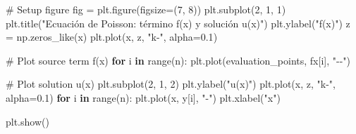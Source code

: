 \documentclass[
  spanish,
  us-letterpaper,
  DIV=11,
  numbers=noendperiod]{scrreprt}
\newenvironment{Shaded}{\begin{snugshade}}{\end{snugshade}}
\newcommand{\BuiltInTok}[1]{\textcolor[rgb]{0.00,0.23,0.31}{#1}}
\newcommand{\CommentTok}[1]{\textcolor[rgb]{0.37,0.37,0.37}{#1}}
\newcommand{\ControlFlowTok}[1]{\textcolor[rgb]{0.00,0.23,0.31}{\textbf{#1}}}
\newcommand{\DecValTok}[1]{\textcolor[rgb]{0.68,0.00,0.00}{#1}}
\newcommand{\FloatTok}[1]{\textcolor[rgb]{0.68,0.00,0.00}{#1}}
\newcommand{\KeywordTok}[1]{\textcolor[rgb]{0.00,0.23,0.31}{\textbf{#1}}}
\newcommand{\NormalTok}[1]{\textcolor[rgb]{0.00,0.23,0.31}{#1}}
\newcommand{\OperatorTok}[1]{\textcolor[rgb]{0.37,0.37,0.37}{#1}}
\newcommand{\StringTok}[1]{\textcolor[rgb]{0.13,0.47,0.30}{#1}}
\theoremstyle{plain}
\theoremstyle{definition}
\theoremstyle{remark}
\begin{document}
\begin{Shaded}
\begin{Highlighting}[]
\CommentTok{\# Setup figure}
\NormalTok{fig }\OperatorTok{=}\NormalTok{ plt.figure(figsize}\OperatorTok{=}\NormalTok{(}\DecValTok{7}\NormalTok{, }\DecValTok{8}\NormalTok{))}
\NormalTok{plt.subplot(}\DecValTok{2}\NormalTok{, }\DecValTok{1}\NormalTok{, }\DecValTok{1}\NormalTok{)}
\NormalTok{plt.title(}\StringTok{"Ecuación de Poisson: término f(x) y solución u(x)"}\NormalTok{)}
\NormalTok{plt.ylabel(}\StringTok{"f(x)"}\NormalTok{)}
\NormalTok{z }\OperatorTok{=}\NormalTok{ np.zeros\_like(x)}
\NormalTok{plt.plot(x, z, }\StringTok{"k{-}"}\NormalTok{, alpha}\OperatorTok{=}\FloatTok{0.1}\NormalTok{)}

\CommentTok{\# Plot source term f(x)}
\ControlFlowTok{for}\NormalTok{ i }\KeywordTok{in} \BuiltInTok{range}\NormalTok{(n):}
\NormalTok{    plt.plot(evaluation\_points, fx[i], }\StringTok{"{-}{-}"}\NormalTok{)}

\CommentTok{\# Plot solution u(x)}
\NormalTok{plt.subplot(}\DecValTok{2}\NormalTok{, }\DecValTok{1}\NormalTok{, }\DecValTok{2}\NormalTok{)}
\NormalTok{plt.ylabel(}\StringTok{"u(x)"}\NormalTok{)}
\NormalTok{plt.plot(x, z, }\StringTok{"k{-}"}\NormalTok{, alpha}\OperatorTok{=}\FloatTok{0.1}\NormalTok{)}
\ControlFlowTok{for}\NormalTok{ i }\KeywordTok{in} \BuiltInTok{range}\NormalTok{(n):}
\NormalTok{    plt.plot(x, y[i], }\StringTok{"{-}"}\NormalTok{)}
\NormalTok{plt.xlabel(}\StringTok{"x"}\NormalTok{)}

\NormalTok{plt.show()}
\end{Highlighting}
\end{Shaded}
\end{document}
